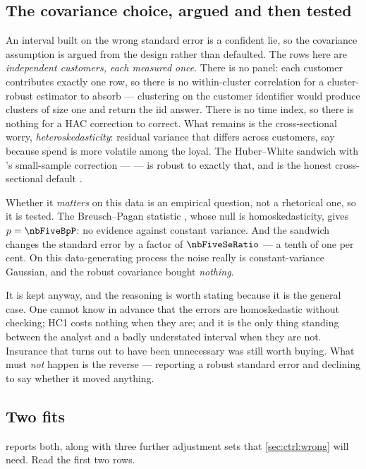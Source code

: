 \subsection*{The covariance choice, argued and then tested}

An interval built on the wrong standard error is a confident lie, so the covariance assumption is
argued from the design rather than defaulted. The rows here are \nbFiveN{} \emph{independent
customers, each measured once}. There is no panel: each customer contributes exactly one row, so
there is no within-cluster correlation for a cluster-robust estimator to absorb --- clustering on
the customer identifier would produce clusters of size one and return the iid answer. There is no
time index, so there is nothing for a HAC correction to correct. What remains is the
cross-sectional worry, \emph{heteroskedasticity}: residual variance that differs across
customers, say because spend is more volatile among the loyal. The Huber--White sandwich with
\citeauthor{mackinnon1985}'s small-sample correction ---  --- is robust to exactly that,
and is the honest cross-sectional default \citep{white1980, mackinnon1985}.

Whether it \emph{matters} on this data is an empirical question, not a rhetorical one, so it is
tested. The Breusch--Pagan statistic \citep{breusch1979}, whose null is homoskedasticity, gives
$p = \nbFiveBpP$: no evidence against constant variance. And the sandwich changes the standard
error by a factor of $\nbFiveSeRatio$ --- a tenth of one per cent. On this data-generating
process the noise really is constant-variance Gaussian, and the robust covariance bought
\emph{nothing}.

It is kept anyway, and the reasoning is worth stating because it is the general case. One cannot
know in advance that the errors are homoskedastic without checking; HC1 costs nothing when they
are; and it is the only thing standing between the analyst and a badly understated interval when
they are not. Insurance that turns out to have been unnecessary was still worth buying. What must
\emph{not} happen is the reverse --- reporting a robust standard error and declining to say
whether it moved anything.

\subsection*{Two fits}

 reports both, along with three further adjustment sets that
\cref{sec:ctrl:wrong} will need. Read the first two rows.

